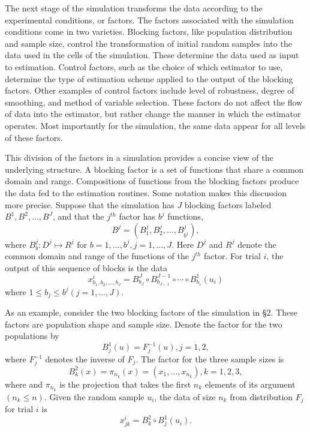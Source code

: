 The next stage of the simulation transforms the data according to the
experimental conditions, or factors.  The factors associated with the
simulation conditions come in two varieties.  Blocking factors, like
population distribution and sample size, control the transformation
of initial random samples into the data used in the cells of the
simulation.  These determine the data used as input to estimation.  
Control factors, such as the choice of which estimator to use,
determine the type of estimation scheme applied to the output of the
blocking factors.  Other examples of control factors include level of
robustness, degree of smoothing, and method of variable selection. 
These factors do not affect the flow of data into the estimator, but
rather change the manner in which the estimator operates.  Most
importantly for the simulation, the same data appear for all levels
of these factors.


This division of the factors in a simulation provides a concise view
of the underlying structure.  A blocking factor is a set of functions
that share a common domain and range.  Compositions of functions from
the blocking factors produce the data fed to the estimation
routines.  Some notation makes this discussion more precise.  Suppose
that the simulation has $J$ blocking factors labeled $B^1,
B^2,\ldots, B^J$, and that the $j^{th}$ factor has $b^j$ functions,
\begin{equation}
B^j=  (B_1^j,B_2^j,\ldots,B_{b^j}^j),
\end{equation}
where $B_b^j:D^j\mapsto R^j$ for $b=1,\ldots,b^j, j=1,\ldots,J$. 
Here $D^j$ and $R^j$ denote the common domain and range of the
functions of the $j^{th}$ factor. For trial $i$, the output of this
sequence of blocks is the data
\begin{equation}
x^i_{b_1,b_2,\ldots,b_J} =
B_{b_J}^J \circ B_{b_{J-1}}^{J-1} \circ \cdots \circ B_{b_1}^1 (u_i)
\label{eq:block}
\end{equation}
where  $1 \leq b_j \leq b^j (j = 1,...,J)$.


As an example, consider the two blocking factors of the simulation in
\S2.  These factors are population shape and sample size. Denote the
factor for the two populations by
$$ B_j^1(u) = F_j^{-1}(u), j=1,2,$$
where $F_j^{-1}$ denotes the inverse of $F_j$.  The factor for the three
sample sizes is
$$ B_k^2(x) = \pi_{n_k}(x) = (x_1,\ldots,x_{n_k}),k=1,2,3,$$
where and $\pi_{n_k}$ is the projection that takes the first $n_k$
elements of its argument $(n_k \leq n)$. Given the random sample $u_i$,
the data of size $n_k$ from distribution $F_j$ for trial $i$ is
$$x^i_{jk}= B_k^2 \circ B_j^1(u_i).$$



